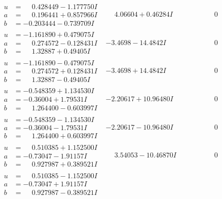 \documentclass[1p]{elsarticle_modified}
\theoremstyle{definition}
\begin{document}
$$\begin{array}{c|c|c}
 \hline 
\begin{aligned}
u &= \phantom{-}0.428449 - 1.177750 I \\
a &= \phantom{-}0.196441 + 0.857966 I \\
b &= -0.203444 - 0.739709 I\end{aligned}
 & \phantom{-}4.06604 + 0.46284 I & \phantom{-0.000000 } 0 \\ \hline\begin{aligned}
u &= -1.161890 + 0.479075 I \\
a &= \phantom{-}0.274572 - 0.128431 I \\
b &= \phantom{-}1.32887 + 0.49405 I\end{aligned}
 & -3.4698 - 14.4842 I & \phantom{-0.000000 } 0 \\ \hline\begin{aligned}
u &= -1.161890 - 0.479075 I \\
a &= \phantom{-}0.274572 + 0.128431 I \\
b &= \phantom{-}1.32887 - 0.49405 I\end{aligned}
 & -3.4698 + 14.4842 I & \phantom{-0.000000 } 0 \\ \hline\begin{aligned}
u &= -0.548359 + 1.134530 I \\
a &= -0.36004 + 1.79531 I \\
b &= \phantom{-}1.264400 - 0.603997 I\end{aligned}
 & -2.20617 + 10.96480 I & \phantom{-0.000000 } 0 \\ \hline\begin{aligned}
u &= -0.548359 - 1.134530 I \\
a &= -0.36004 - 1.79531 I \\
b &= \phantom{-}1.264400 + 0.603997 I\end{aligned}
 & -2.20617 - 10.96480 I & \phantom{-0.000000 } 0 \\ \hline\begin{aligned}
u &= \phantom{-}0.510385 + 1.152500 I \\
a &= -0.73047 - 1.91157 I \\
b &= \phantom{-}0.927987 + 0.389521 I\end{aligned}
 & \phantom{-}3.54053 - 10.46870 I & \phantom{-0.000000 } 0 \\ \hline\begin{aligned}
u &= \phantom{-}0.510385 - 1.152500 I \\
a &= -0.73047 + 1.91157 I \\
b &= \phantom{-}0.927987 - 0.389521 I\end{aligned}

\end{array}$$
\end{document}
